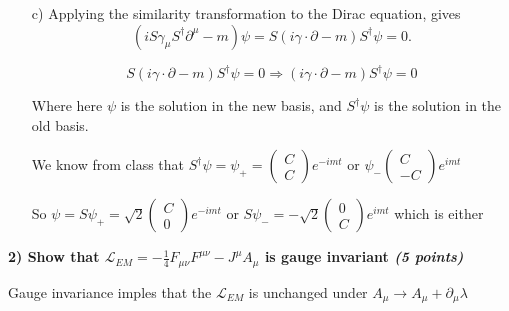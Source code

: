 {\begin{itemize}
So both A and C are $\pm I$ and above implies that $a = -c$

So $S = \frac{1}{\sqrt{2}}\begin{pmatrix} I & I \\ -I & I \end{pmatrix}$
and $S^\dagger = \frac{1}{\sqrt{2}}\begin{pmatrix} I & -I \\ I & I \end{pmatrix}$


\item[c)]
 Applying the similarity transformation to the Dirac equation, gives 
\begin{equation*}
(i S \gamma_\mu S^\dagger \partial^{\mu} - m)\psi = S(i\gamma \cdot \partial - m)S^\dagger\psi = 0.
\end{equation*}

\begin{equation*}
S(i\gamma \cdot \partial - m)S^\dagger\psi = 0 \Rightarrow (i\gamma \cdot \partial - m)S^\dagger\psi = 0
\end{equation*}

Where here $\psi$ is the solution in the new basis, and $S^\dagger \psi$ is the solution in the old basis.


We know from class that $S^\dagger \psi = \psi_+ = \begin{pmatrix} C \\ C \end{pmatrix} e ^{-imt}$ or $\psi_- \begin{pmatrix} C \\ -C \end{pmatrix} e^{imt}$

So $\psi = S\psi_+ = \sqrt{2} \begin{pmatrix}  C \\ 0 \end{pmatrix} e ^{-imt}$ or $S\psi_- = -\sqrt{2} \begin{pmatrix} 0 \\  C \end{pmatrix} e ^{imt}$ which is either 


\end{itemize}

\vspace*{0.25in}

\textbf{2) Show that  $\mathscr{L}_{EM} = -\frac{1}{4}F_{\mu\nu}F^{\mu\nu} - J^{\mu}A_{\mu}$ is gauge invariant \hfill \textit{(5 points)}}

Gauge invariance imples that the $\mathscr{L}_{EM}$ is unchanged under $A_\mu \rightarrow A_\mu + \partial_\mu \lambda$


}

